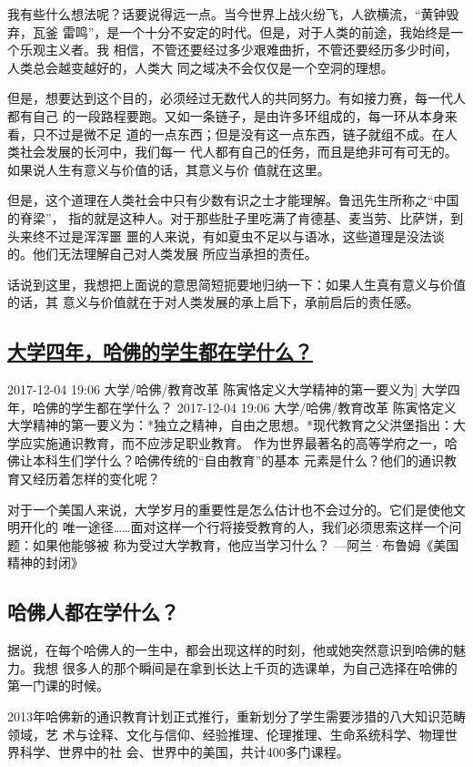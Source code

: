 \documentclass[11pt]{ctexart}
\begin{document}
{{{{我有些什么想法呢？话要说得远一点。当今世界上战火纷飞，人欲横流，“黄钟毁弃，瓦釜
雷鸣”，是一个十分不安定的时代。但是，对于人类的前途，我始终是一个乐观主义者。我
相信，不管还要经过多少艰难曲折，不管还要经历多少时间，人类总会越变越好的，人类大
同之域决不会仅仅是一个空洞的理想。



但是，想要达到这个目的，必须经过无数代人的共同努力。有如接力赛，每一代人都有自己
的一段路程要跑。又如一条链子，是由许多环组成的，每一环从本身来看，只不过是微不足
道的一点东西；但是没有这一点东西，链子就组不成。在人类社会发展的长河中，我们每一
代人都有自己的任务，而且是绝非可有可无的。如果说人生有意义与价值的话，其意义与价
值就在这里。

但是，这个道理在人类社会中只有少数有识之士才能理解。鲁迅先生所称之“中国的脊梁”，
指的就是这种人。对于那些肚子里吃满了肯德基、麦当劳、比萨饼，到头来终不过是浑浑噩
噩的人来说，有如夏虫不足以与语冰，这些道理是没法谈的。他们无法理解自己对人类发展
所应当承担的责任。

话说到这里，我想把上面说的意思简短扼要地归纳一下：如果人生真有意义与价值的话，其
意义与价值就在于对人类发展的承上启下，承前启后的责任感。

\subsection{\href{http://www.sohu.com/a/208387303\_372406}{大学四年，哈佛的学生都在学什么？}}
\label{sec:org49fc885}
2017-12-04 19:06 大学/哈佛/教育改革
陈寅恪定义大学精神的第一要义为]
大学四年，哈佛的学生都在学什么？
2017-12-04 19:06 大学/哈佛/教育改革
陈寅恪定义大学精神的第一要义为：*独立之精神，自由之思想。*现代教育之父洪堡指出：大
学应实施通识教育，而不应涉足职业教育。
作为世界最著名的高等学府之一，哈佛让本科生们学什么？哈佛传统的“自由教育”的基本
元素是什么？他们的通识教育又经历着怎样的变化呢？


对于一个美国人来说，大学岁月的重要性是怎么估计也不会过分的。它们是使他文明开化的
唯一途径……面对这样一个行将接受教育的人，我们必须思索这样一个问题：如果他能够被
称为受过大学教育，他应当学习什么？
—阿兰·布鲁姆《美国精神的封闭》
\subsection{哈佛人都在学什么？}
\label{sec:org5a1d7d1}
据说，在每个哈佛人的一生中，都会出现这样的时刻，他或她突然意识到哈佛的魅力。我想
很多人的那个瞬间是在拿到长达上千页的选课单，为自己选择在哈佛的第一门课的时候。

2013年哈佛新的通识教育计划正式推行，重新划分了学生需要涉猎的八大知识范畴领域，艺
术与诠释、文化与信仰、经验推理、伦理推理、生命系统科学、物理世界科学、世界中的社
会、世界中的美国，共计400多门课程。

}}}}
\end{document}

